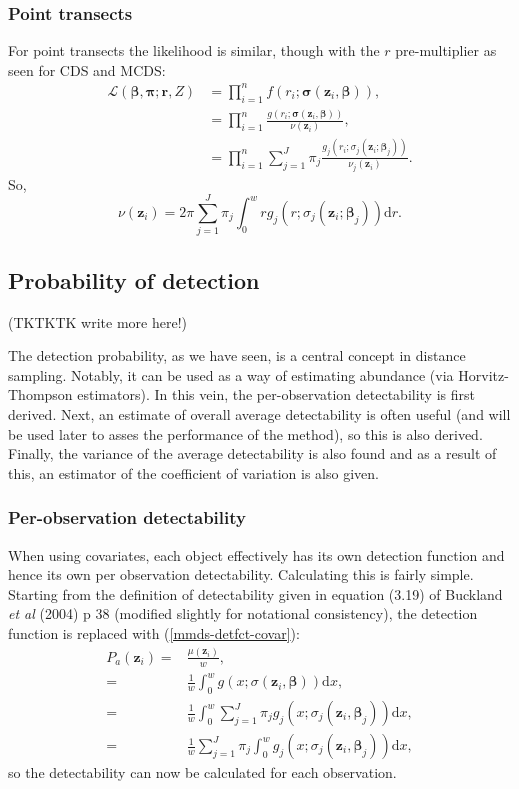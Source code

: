 \subsubsection{Point transects}
For point transects the likelihood is similar, though with the $r$ pre-multiplier as seen for CDS and MCDS:
\begin{align}
\mathcal{L}(\bm{\beta}, \bm{\pi} ; \bm{r}, Z) &= \prod_{i=1}^n f(r_i;\bm{\sigma}(\bm{z}_i, \bm{\beta})),\\
&= \prod_{i=1}^n \frac{g(r_i;\bm{\sigma}(\bm{z}_i, \bm{\beta}))}{\nu(\bm{z}_i)},\\
&= \prod_{i=1}^n \sum_{j=1}^J \pi_j \frac{g_j(r_i; \sigma_j(\bm{z}_i;\bm{\beta}_j))}{ \nu_j(\bm{z}_i)}.
\label{mmds-pt-glikelihood}
\end{align}
So,
\begin{equation}
\nu(\bm{z}_i) = 2 \pi \sum_{j=1}^J \pi_j \int_0^w r g_j(r; \sigma_j(\bm{z}_i;\bm{\beta}_j)) \text{d}r.
\end{equation}


\subsection{Probability of detection}

(TKTKTK write more here!)

The detection probability, as we have seen, is a central concept in distance sampling. Notably, it can be used as a way of estimating abundance (via Horvitz-Thompson estimators). In this vein, the per-observation detectability is first derived. Next, an estimate of overall average detectability is often useful (and will be used later to asses the performance of the method), so this is also derived. Finally, the variance of the average detectability is also found and as a result of this, an estimator of the coefficient of variation is also given.

\subsubsection{Per-observation detectability}
When using covariates, each object effectively has its own detection function and hence its own per observation detectability. Calculating this is fairly simple. Starting from the definition of detectability given in equation (3.19) of Buckland \textit{et al} (2004) p 38 (modified slightly for notational consistency), the detection function is replaced with (\ref{mmds-detfct-covar}):
\begin{align*}
P_a(\bm{z}_i) =& \frac{\mu(\bm{z}_i)}{w},\\
=& \frac{1}{w} \int_0^w g(x; \sigma(\bm{z}_i,\bm{\beta})) \text{d}x,\\
=& \frac{1}{w} \int_0^w \sum_{j=1}^J \pi_j g_j(x; \sigma_j(\bm{z}_i, \bm{\beta}_j)) \text{d}x,\\
=& \frac{1}{w} \sum_{j=1}^J \pi_j \int_0^w  g_j(x; \sigma_j(\bm{z}_i, \bm{\beta}_j)) \text{d}x,
\end{align*}
so the detectability can now be calculated for each observation.



